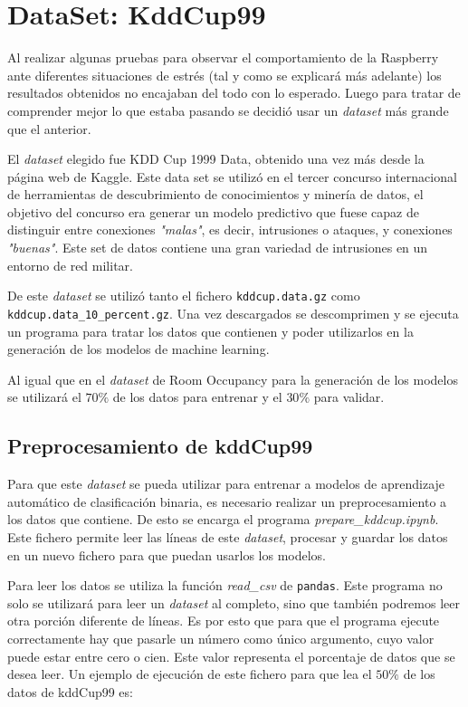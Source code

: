 \documentclass[a4paper, 12pt]{book}
\begin{document}
\section{DataSet: KddCup99}
\label{subsec:dataset_kddcup99}

Al realizar algunas pruebas para observar el comportamiento de la Raspberry ante diferentes situaciones de estrés (tal y como se explicará más adelante) los resultados obtenidos no encajaban del todo con lo esperado. Luego para tratar de comprender mejor lo que estaba pasando se decidió usar un \textit{dataset} más grande que el anterior.

El \textit{dataset} elegido fue KDD Cup 1999 Data\cite{DataSetKddCup99}, obtenido una vez más desde la página web de Kaggle. Este data set se utilizó en el tercer concurso internacional de herramientas de descubrimiento de conocimientos y minería de datos, el objetivo del concurso era generar un modelo predictivo que fuese capaz de distinguir entre conexiones \textit{"malas"}, es decir, intrusiones o ataques, y conexiones \textit{"buenas"}. Este set de datos contiene una gran variedad de intrusiones en un entorno de red militar. 

De este \textit{dataset} se utilizó tanto el fichero \texttt{kddcup.data.gz} como \texttt{kddcup.data\_10\_percent.gz}. Una vez descargados se descomprimen y se ejecuta un programa para tratar los datos que contienen y poder utilizarlos en la generación de los modelos de machine learning.

Al igual que en el \textit{dataset} de Room Occupancy para la generación de los modelos se utilizará el $70\%$ de los datos para entrenar y el $30\%$ para validar.

\subsection{Preprocesamiento de kddCup99}
\label{subsec:preprocesamiento_kddcup}

Para que este \textit{dataset} se pueda utilizar para entrenar a modelos de aprendizaje automático de clasificación binaria, es necesario realizar un preprocesamiento a los datos que contiene. De esto se encarga el programa \textit{prepare\_kddcup.ipynb}. Este fichero permite leer las líneas de este \textit{dataset}, procesar y guardar los datos en un nuevo fichero para que puedan usarlos los modelos.

Para leer los datos se utiliza la función \textit{read\_csv} de \texttt{pandas}. Este programa no solo se utilizará para leer un \textit{dataset} al completo, sino que también podremos leer otra porción diferente de líneas. Es por esto que para que el programa ejecute correctamente hay que pasarle un número como único argumento, cuyo valor puede estar entre cero o cien. Este valor representa el porcentaje de datos que se desea leer. Un ejemplo de ejecución de este fichero para que lea el $50\%$ de los datos de kddCup99 es:\\
\end{document}
